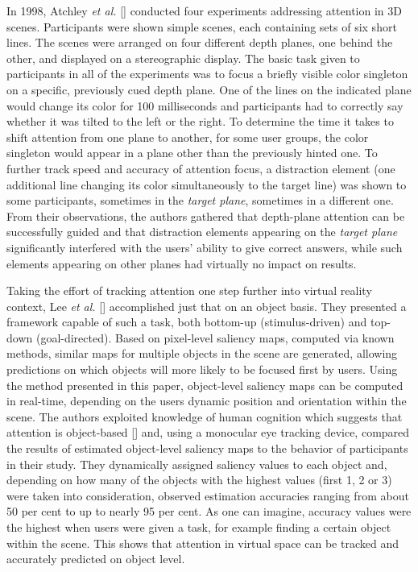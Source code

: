 In 1998, Atchley \textit{et al.} [\cite{atchleyattentional}] conducted four experiments addressing attention in 3D scenes. Participants were shown simple scenes, each containing sets of six short lines. The scenes were arranged on four different depth planes, one behind the other, and displayed on a stereographic display. The basic task given to participants in all of the experiments was to focus a briefly visible color singleton on a specific, previously cued depth plane. One of the lines on the indicated plane would change its color for 100 milliseconds and participants had to correctly say whether it was tilted to the left or the right. To determine the time it takes to shift attention from one plane to another, for some user groups, the color singleton would appear in a plane other than the previously hinted one. To further track speed and accuracy of attention focus, a distraction element (one additional line changing its color simultaneously to the target line) was shown to some participants, sometimes in the \textit{target plane}, sometimes in a different one. From their observations, the authors gathered that depth-plane attention can be successfully guided and that distraction elements appearing on the \textit{target plane} significantly interfered with the users' ability to give correct answers, while such elements appearing on other planes had virtually no impact on results.

Taking the effort of tracking attention one step further into virtual reality context, Lee \textit{et al.} [\cite{lee2007real}] accomplished just that on an object basis. They presented a framework capable of such a task, both bottom-up (stimulus-driven) and top-down (goal-directed). Based on pixel-level saliency maps, computed via known methods, similar maps for multiple objects in the scene are generated, allowing predictions on which objects will more likely to be focused first by users. Using the method presented in this paper, object-level saliency maps can be computed in real-time, depending on the users dynamic position and orientation within the scene. The authors exploited knowledge of human cognition which suggests that attention is object-based [\cite{o1999fmri}] and, using a monocular eye tracking device, compared the results of estimated object-level saliency maps to the behavior of participants in their study. They dynamically assigned saliency values to each object and, depending on how many of the objects with the highest values (first 1, 2 or 3) were taken into consideration, observed estimation accuracies ranging from about 50 per cent to up to nearly 95 per cent. As one can imagine, accuracy values were the highest when users were given a task, for example finding a certain object within the scene. This shows that attention in virtual space can be tracked and accurately predicted on object level.

